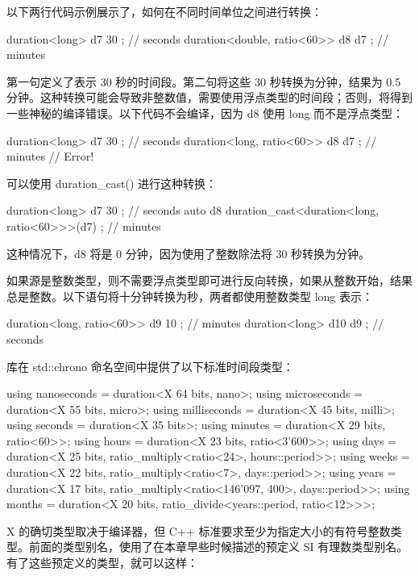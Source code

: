 以下两行代码示例展示了，如何在不同时间单位之间进行转换：

\begin{cpp}
duration<long> d7 { 30 }; // seconds
duration<double, ratio<60>> d8 { d7 }; // minutes
\end{cpp}

第一句定义了表示 30 秒的时间段。第二句将这些 30 秒转换为分钟，结果为 0.5 分钟。这种转换可能会导致非整数值，需要使用浮点类型的时间段；否则，将得到一些神秘的编译错误。以下代码不会编译，因为 d8 使用 long 而不是浮点类型：

\begin{cpp}
duration<long> d7 { 30 }; // seconds
duration<long, ratio<60>> d8 { d7 }; // minutes // Error!
\end{cpp}

可以使用 duration\_cast() 进行这种转换：

\begin{cpp}
duration<long> d7 { 30 }; // seconds
auto d8 { duration_cast<duration<long, ratio<60>>>(d7) }; // minutes
\end{cpp}

这种情况下，d8 将是 0 分钟，因为使用了整数除法将 30 秒转换为分钟。

如果源是整数类型，则不需要浮点类型即可进行反向转换，如果从整数开始，结果总是整数。以下语句将十分钟转换为秒，两者都使用整数类型 long 表示：

\begin{cpp}
duration<long, ratio<60>> d9 { 10 }; // minutes
duration<long> d10 { d9 }; // seconds
\end{cpp}


库在 std::chrono 命名空间中提供了以下标准时间段类型：

\begin{cpp}
using nanoseconds = duration<X 64 bits, nano>;
using microseconds = duration<X 55 bits, micro>;
using milliseconds = duration<X 45 bits, milli>;
using seconds = duration<X 35 bits>;
using minutes = duration<X 29 bits, ratio<60>>;
using hours = duration<X 23 bits, ratio<3'600>>;
using days = duration<X 25 bits, ratio_multiply<ratio<24>, hours::period>>;
using weeks = duration<X 22 bits, ratio_multiply<ratio<7>, days::period>>;
using years = duration<X 17 bits,
              ratio_multiply<ratio<146'097, 400>, days::period>>;
using months = duration<X 20 bits, ratio_divide<years::period, ratio<12>>>;
\end{cpp}

X 的确切类型取决于编译器，但 C++ 标准要求至少为指定大小的有符号整数类型。前面的类型别名，使用了在本章早些时候描述的预定义 SI 有理数类型别名。有了这些预定义的类型，就可以这样：

